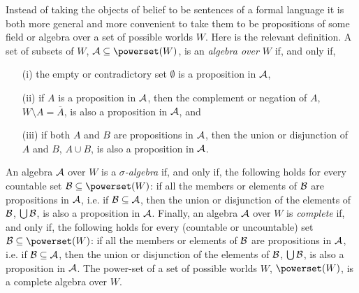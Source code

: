 Instead of taking the objects of belief to be sentences of a formal language it is both more general and more convenient to take them to be propositions of some field or algebra over a set of possible worlds $W$. Here is the relevant definition. A set of subsets of $W$, $\begin{cal}A\end{cal}\subseteq\powerset\!\left(W\right)$, is an \emph{algebra over $W$} if, and only if,
\begin{enumerate}
\item[(i)] the empty or contradictory set $\emptyset$ is a proposition in $\cal A$,
\item[(ii)] if $A$ is a proposition in $\cal A$, then the complement or negation of $A$, $W\setminus A=\overline{A}$, is also a proposition in $\cal A$, and
\item[(iii)] if both $A$ and $B$ are propositions in $\cal A$, then the union or disjunction of $A$ and $B$, $A\cup B$, is also a proposition in $\cal A$.
\end{enumerate}
An algebra $\cal A$ over $W$ is a \emph{$\sigma$-algebra} if, and only if, the following holds for every countable set $\begin{cal}B\end{cal}\subseteq\powerset\!\left(W\right)$: if all the members or elements of $\begin{cal}B\end{cal}$ are propositions in $\cal A$, i.e. if $\cal B\subseteq A$, then the union or disjunction of the elements of $\cal B$, $\bigcup\cal B$, is also a proposition in $\cal A$. Finally, %
an algebra $\cal A$ over $W$ is \emph{complete} if, and only if, the following holds for every (countable or uncountable) set $\begin{cal}B\end{cal}\subseteq\powerset\!\left(W\right)$: if all the members or elements of $\begin{cal}B\end{cal}$ are propositions in $\cal A$, i.e. if $\cal B\subseteq A$, then the union or disjunction of the elements of $\cal B$, $\bigcup\cal B$, is also a proposition in $\cal A$. The power-set of a set of possible worlds $W$, $\powerset\!\left(W\right)$, is a complete algebra over $W$.
